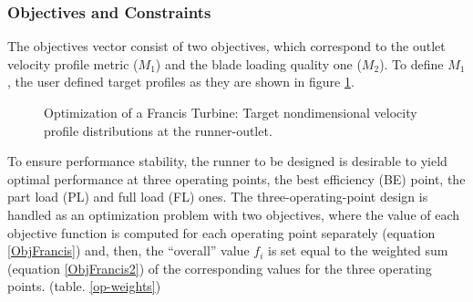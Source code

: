 
\subsubsection{Objectives and Constraints}
The objectives vector consist of two objectives, which correspond to the outlet velocity profile metric ($M_1$) and the blade loading quality one ($M_2$). To define $M_1$, the user defined target profiles as they are shown in figure \ref{design-obj-tar}. 



\begin{figure}[h!]
\begin{minipage}[b]{1\linewidth}
 \centering
\end{minipage}
\caption{Optimization of a Francis Turbine: Target nondimensional velocity profile distributions at the runner-outlet.}
\label{design-obj-tar}
\end{figure}


To ensure performance stability, the runner to be designed is desirable to yield optimal performance at three operating points, the best efficiency (BE) point, the part load (PL) and full load (FL) ones. %
The three-operating-point design is handled as an optimization problem with two objectives, where the value of each objective function is computed for each operating point separately (equation \ref{ObjFrancis}) and, then, the “overall” value $f_i$ is set equal to the weighted sum (equation \ref{ObjFrancis2}) of the corresponding values for the three operating points. (table. \ref{op-weights}) 


